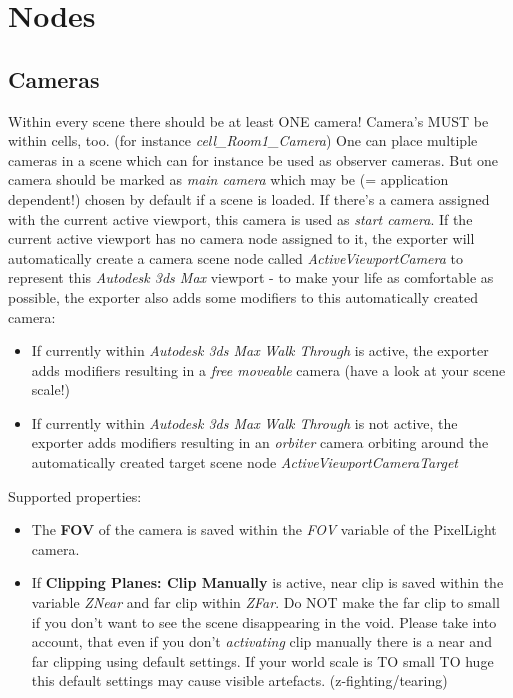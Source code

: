 \chapter{Nodes}




\section{Cameras}
Within every scene there should be at least ONE camera! Camera's MUST be within cells, too. (for instance \emph{cell\_Room1\_Camera}) One can place multiple cameras in a scene which can for instance be used as observer cameras. But one camera should be marked as \emph{main camera} which may be (= application dependent!) chosen by default if a scene is loaded. If there's a camera assigned with the current active viewport, this camera is used as \emph{start camera}. If the current active viewport has no camera node assigned to it, the exporter will automatically create a camera scene node called \emph{ActiveViewportCamera} to represent this \emph{Autodesk 3ds Max} viewport - to make your life as comfortable as possible, the exporter also adds some modifiers to this automatically created camera:
\begin{itemize}
\item{If currently within \emph{Autodesk 3ds Max} \emph{Walk Through} is active, the exporter adds modifiers resulting in a \emph{free moveable} camera (have a look at your scene scale!)}
\item{If currently within \emph{Autodesk 3ds Max} \emph{Walk Through} is not active, the exporter adds modifiers resulting in an \emph{orbiter} camera orbiting around the automatically created target scene node \emph{ActiveViewportCameraTarget}}
\end{itemize}

Supported properties:
\begin{itemize}
\item{The \textbf{FOV} of the camera is saved within the \emph{FOV} variable of the PixelLight camera.}
\item{If \textbf{Clipping Planes: Clip Manually} is active, near clip is saved within the variable \emph{ZNear} and far clip within \emph{ZFar}. Do NOT make the far clip to small if you don't want to see the scene disappearing in the void. Please take into account, that even if you don't \emph{activating} clip manually there is a near and far clipping using default settings. If your world scale is TO small TO huge this default settings may cause visible artefacts. (z-fighting/tearing)}
\end{itemize}

